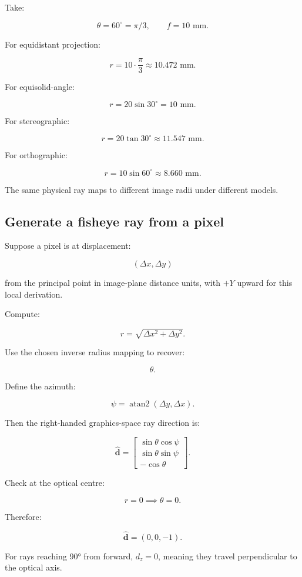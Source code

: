 Take:

\[ \theta=60^\circ=\pi/3, \qquad f=10\text{ mm}. \]

For equidistant projection:

\[ r=10\cdot\frac\pi3 \approx\boxed{10.472\text{ mm}}. \]

For equisolid-angle:

\[ r=20\sin30^\circ =\boxed{10\text{ mm}}. \]

For stereographic:

\[ r=20\tan30^\circ \approx\boxed{11.547\text{ mm}}. \]

For orthographic:

\[ r=10\sin60^\circ \approx\boxed{8.660\text{ mm}}. \]

The same physical ray maps to different image radii under different models.

\subsection{Generate a fisheye ray from a pixel}\label{02-foundations-ii-ch035-generate-a-fisheye-ray-from-a-pixel}

Suppose a pixel is at displacement:

\[ (\Delta x,\Delta y) \]

from the principal point in image-plane distance units, with \(+Y\) upward for this local derivation.

Compute:

\[ r=\sqrt{\Delta x^2+\Delta y^2}. \]

Use the chosen inverse radius mapping to recover:

\[ \theta. \]

Define the azimuth:

\[ \psi=\operatorname{atan2}(\Delta y,\Delta x). \]

Then the right-handed graphics-space ray direction is:

\[ \boxed{ \hat{\mathbf d}= \begin{bmatrix} \sin\theta\cos\psi\\ \sin\theta\sin\psi\\ -\cos\theta \end{bmatrix}. } \]

Check at the optical centre:

\[ r=0\implies\theta=0. \]

Therefore:

\[ \hat{\mathbf d}=(0,0,-1). \]

For rays reaching 90° from forward, \(d_z=0\), meaning they travel perpendicular to the optical axis.

